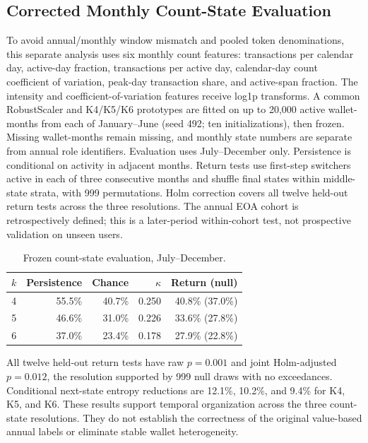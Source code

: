 \subsection{Corrected Monthly Count-State Evaluation}
To avoid annual/monthly window mismatch and pooled token denominations, this separate analysis uses six monthly count features: transactions per calendar day, active-day fraction, transactions per active day, calendar-day count coefficient of variation, peak-day transaction share, and active-span fraction. The intensity and coefficient-of-variation features receive log1p transforms. A common RobustScaler and K4/K5/K6 prototypes are fitted on up to 20,000 active wallet-months from each of January--June (seed 492; ten initializations), then frozen. Missing wallet-months remain missing, and monthly state numbers are separate from annual role identifiers.
Evaluation uses July--December only. Persistence is conditional on activity in adjacent months. Return tests use first-step switchers active in each of three consecutive months and shuffle final states within middle-state strata, with 999 permutations. Holm correction covers all twelve held-out return tests across the three resolutions. The annual EOA cohort is retrospectively defined; this is a later-period within-cohort test, not prospective validation on unseen users.
\begin{table}[t]\centering\caption{Frozen count-state evaluation, July--December.}\label{tab:corrected_temporal}\small
\begin{tabular}{crrrr}\toprule $k$ & Persistence & Chance & $\kappa$ & Return (null) \\\midrule
4 & 55.5\% & 40.7\% & 0.250 & 40.8\% (37.0\%) \\
5 & 46.6\% & 31.0\% & 0.226 & 33.6\% (27.8\%) \\
6 & 37.0\% & 23.4\% & 0.178 & 27.9\% (22.8\%) \\
\bottomrule\end{tabular}\end{table}
All twelve held-out return tests have raw $p=0.001$ and joint Holm-adjusted $p=0.012$, the resolution supported by 999 null draws with no exceedances. Conditional next-state entropy reductions are 12.1\%, 10.2\%, and 9.4\% for K4, K5, and K6. These results support temporal organization across the three count-state resolutions. They do not establish the correctness of the original value-based annual labels or eliminate stable wallet heterogeneity.
